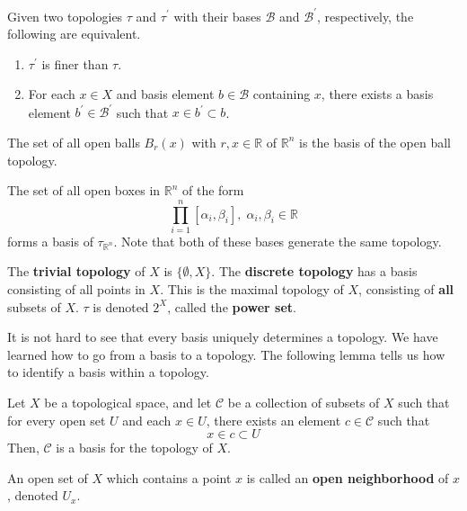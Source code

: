 \documentclass{article}
\begin{document}
    \begin{lemma}
    Given two topologies $\tau$ and $\tau^\prime$ with their bases $\mathscr{B}$ and $\mathscr{B}^\prime$, respectively, the following are equivalent. 
    \begin{enumerate}
        \item $\tau^\prime$ is finer than $\tau$. 
        \item For each $x \in X$ and basis element $b \in \mathscr{B}$ containing $x$, there exists a basis element $b^\prime \in \mathscr{B}^\prime$ such that $x \in b^\prime \subset b$. 
    \end{enumerate}
    \end{lemma}

    \begin{example}
    The set of all open balls $B_r (x)$ with $r, x \in \mathbb{R}$ of $\mathbb{R}^n$ is the basis of the open ball topology. 

    The set of all open boxes in $\mathbb{R}^{n}$ of the form 
    \[\prod_{i=1}^n [\alpha_i, \beta_i], \; \alpha_i, \beta_i \in \mathbb{R} \]
    forms a basis of $\tau_{\mathbb{R}^{n}}$. Note that both of these bases generate the same topology. 
    \end{example}

    \begin{definition}
    The \textbf{trivial topology} of $X$ is $\{\emptyset, X\}$. The \textbf{discrete topology} has a basis consisting of all points in $X$. This is the maximal topology of $X$, consisting of \textbf{all} subsets of $X$. $\tau$ is denoted $2^{X}$, called the \textbf{power set}.
    \end{definition}

    It is not hard to see that every basis uniquely determines a topology. We have learned how to go from a basis to a topology. The following lemma tells us how to identify a basis within a topology. 

    \begin{lemma}
    Let $X$ be a topological space, and let $\mathcal{C}$ be a collection of subsets of $X$ such that for every open set $U$ and each $x \in U$, there exists an element $c \in \mathcal{C}$ such that
    \[x \in c \subset U\]
    Then, $\mathcal{C}$ is a basis for the topology of $X$. 
    \end{lemma}

    \begin{definition}
    An open set of $X$ which contains a point $x$ is called an \textbf{open neighborhood} of $x$, denoted $U_x$. 
    \end{definition}
\end{document}
